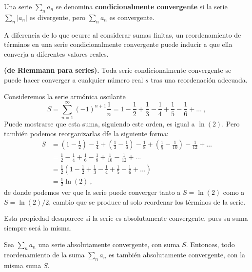 \begin{defi} 
    Una serie $\sum\limits_n a_n$ se denomina \textbf{condicionalmente convergente} si la serie $\sum\limits_n |a_n|$ es divergente, pero $\sum\limits_n a_n$ es convergente.
\end{defi}

A diferencia de lo que ocurre al considerar sumas finitas, un reordenamiento de términos en una serie condicionalmente convergente puede inducir a que ella converja a diferentes valores reales.

\begin{teorema}{\textbf{(de Riemmann para series).}}
    Toda serie condicionalmente convergente se puede hacer converger a cualquier número real $s$ tras una reordenación adecuada.
\end{teorema}

\begin{ejemplo}
    Consideremos la serie armónica oscilante
    \begin{equation*}
        S = \sum_{n=1}^\infty (-1)^{n+1} \frac{1}{n} = 1 - \frac{1}{2} + \frac{1}{3} - \frac{1}{4} + \frac{1}{5} - \frac{1}{6} + \dots \ ,
    \end{equation*}
    Puede mostrarse que esta suma, siguiendo este orden, es igual a $\ln(2)$. Pero también podemos reorganizarlas dfe la siguiente forma:
    \begin{align*}
        S & = \left(1 - \frac{1}{2} \right) - \frac{1}{4} + \left(\frac{1}{3} - \frac{1}{6} \right) - \frac{1}{8} + \left(\frac{1}{5} - \frac{1}{10} \right) - \frac{1}{12} + \dots \\
        & = \frac{1}{2} - \frac{1}{4} + \frac{1}{6} - \frac{1}{8} + \frac{1}{10} - \frac{1}{12} + \dots \\
        & = \frac{1}{2} \left( 1 - \frac{1}{2} + \frac{1}{3} - \frac{1}{4} + \frac{1}{5} - \frac{1}{6} + \dots \right) \\
        & = \frac{1}{2} \ln(2) \ ,
    \end{align*}
    de donde podemos ver que la serie puede converger tanto a $S = \ln(2)$ como a $S = \ln(2)/2$, cambio que se produce al solo reordenar los términos de la serie.
\end{ejemplo}

Esta propiedad desaparece si la serie es absolutamente convergente, pues su suma siempre será la misma.

\begin{teorema}
    Sea $\sum\limits_n a_n$ una serie absolutamente convergente, con suma $S$. Entonces, todo reordenamiento de la suma $\sum\limits_n a_n$ es también absolutamente convergente, con la misma suma $S$.
\end{teorema}

